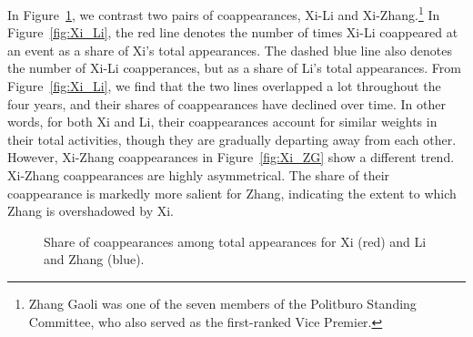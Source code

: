 \documentclass[11pt,english]{article}
\begin{document}
\begin{flushleft}
In Figure~\ref{fig:coappFreqs}, we contrast two pairs of coappearances, Xi-Li and Xi-Zhang.\footnote{Zhang Gaoli was one of the seven members of the Politburo Standing Committee, who also served as the first-ranked Vice Premier.} In Figure~\ref{fig:Xi_Li},  the red line denotes the number of times Xi-Li coappeared at an event as a share of  Xi's total appearances. The dashed blue line also denotes the number of Xi-Li coapperances, but as a share of Li's total appearances. From Figure~\ref{fig:Xi_Li}, we find that the two lines overlapped a lot throughout the four years, and their shares of coappearances have declined over time. In other words, for both Xi and Li, their coappearances account for similar weights in their total activities, though they are gradually departing away from each other. However, Xi-Zhang coappearances in Figure~\ref{fig:Xi_ZG} show a different trend. Xi-Zhang coappearances are highly asymmetrical. The share of their coappearance is markedly more salient for Zhang, indicating the extent to which Zhang is overshadowed by Xi.

\noindent \begin{center}
\begin{figure}[H]
\noindent \begin{centering}
\par\end{centering}
\noindent \begin{centering}
\par\end{centering}
\caption{Share of coappearances among total appearances for Xi (red) and Li and Zhang (blue).}
\label{fig:coappFreqs}
\end{figure}
\par\end{center}


\end{flushleft}
\end{document}
